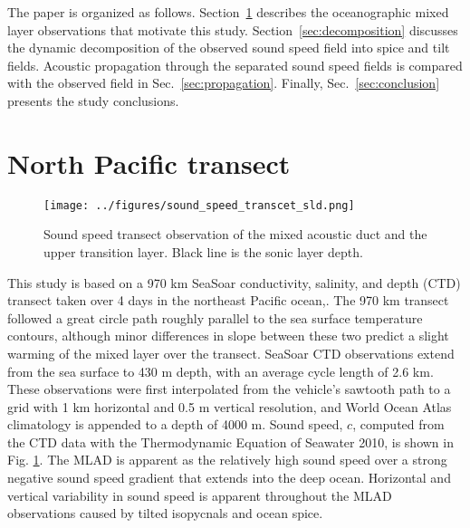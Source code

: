 \documentclass[preprint,NumberedRefs]{JASA}
\begin{document}
The paper is organized as follows. Section~\ref{sec:transcet} describes the oceanographic mixed layer observations that motivate this study. Section~\ref{sec:decomposition} discusses the dynamic decomposition of the observed sound speed field into spice and tilt fields. Acoustic propagation through the separated sound speed fields is compared with the observed field in Sec.~\ref{sec:propagation}. Finally, Sec.~\ref{sec:conclusion} presents the study conclusions.

\section{North Pacific transect}\label{sec:transcet}
\begin{figure}
\texttt{[image: ../figures/sound\_speed\_transcet\_sld.png]}
\caption{\label{fig:c_grid}{Sound speed transect observation of the mixed acoustic duct and the upper transition layer. Black line is the sonic layer depth.}}
\end{figure}

This study is based on a 970 km SeaSoar conductivity, salinity, and depth (CTD) transect taken over 4 days in the northeast Pacific ocean,\citep{cole2010seasonal, colosi2020observations}. The 970 km transect followed a great circle path roughly parallel to the sea surface temperature contours, although minor differences in slope between these two predict a slight warming of the mixed layer over the transect. SeaSoar CTD observations extend from the sea surface to 430 m depth, with an average cycle length of 2.6 km. These observations were first interpolated from the vehicle's sawtooth path to a grid with 1 km horizontal and 0.5 m vertical resolution\citep{colosi2020observations}, and World Ocean Atlas climatology is appended to a depth of 4000 m\citep{WOA}. Sound speed, $c$, computed from the CTD data with the Thermodynamic Equation of Seawater 2010,\cite{TEOS10} is shown in Fig. \ref{fig:c_grid}. The MLAD is apparent as the relatively high sound speed over a strong negative sound speed gradient that extends into the deep ocean. Horizontal and vertical variability in sound speed is apparent throughout the MLAD observations caused by tilted isopycnals and ocean spice\citep{colosi2020observations}.
\end{document}
